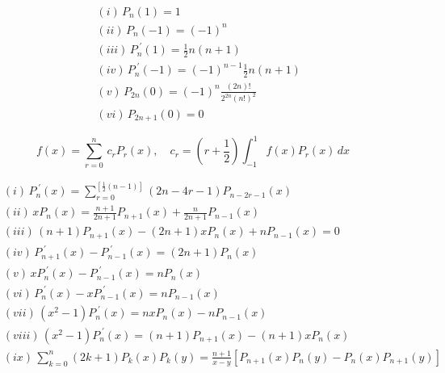 \[\begin{equation} \label{thrm3.4} {\begin{aligned} & (i)\, P_{n}(1)=1\\\ & (ii)\, P_{n}(-1) = (-1)^{n}\\\ & (iii)\, P_{n}^{\;'}(1) = \frac{1}{2}n(n+1)\\\ & (iv)\, P_{n}^{\;'}(-1) = (-1)^{n-1}\frac{1}{2}n(n+1)\\\ & (v)\, P_{2n}(0) = (-1)^{n}\frac{(2n)!}{2^{2n}(n!)^{2}}\\\ & (vi)\, P_{2n+1}(0) = 0 \end{aligned}} \end{equation}\]

\[\begin{equation} \label{thrm3.6} f(x) = \sum_{r=0}^{n}\, c_rP_r(x),\quad c_r = (r + \frac{1}{2})\int_{-1}^{1}f(x)P_r(x)\, dx \end{equation}\]

\[\begin{equation} \label{thrm3.8} {\begin{aligned} & (i)\, P_n^{\;'}(x) = \sum_{r=0}^{\left[ \frac{1}{2}(n-1) \right]}(2n-4r-1)P_{n-2r-1}(x) \\& (ii)\, xP_n(x) = \frac{n+1}{2n+1}P_{n+1}(x) + \frac{n}{2n+1}P_{n-1}(x) \\& (iii)\, (n+1)P_{n+1}(x) - (2n+1)xP_n(x) + nP_{n-1}(x) = 0 \\& (iv)\, P_{n+1}^{\; '}(x) - P_{n-1}^{\; '}(x) = (2n+1)P_n(x) \\& (v)\, xP_n^{\; '}(x) - P_{n-1}^{\; '}(x) = nP_n(x) \\& (vi)\, P_n^{\; '}(x) - xP_{n-1}^{\; '}(x) = nP_{n-1}(x) \\& (vii)\, (x^2-1)P_{n}^{\; '}(x) = nxP_n(x) - nP_{n-1}(x) \\& (viii)\, (x^2-1)P_{n}^{\; '}(x) = (n+1)P_{n+1}(x) - (n+1)xP_n(x) \\& (ix)\, \sum_{k=0}^n(2k+1)P_k(x)P_k(y) = \frac{n+1}{x-y}\left[ P_{n+1}(x)P_n(y) - P_n(x)P_{n+1}(y) \right] \end{aligned}} \end{equation}\]

